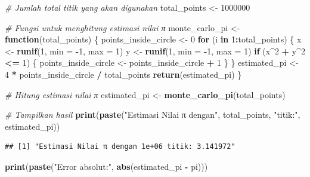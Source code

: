 \documentclass[
]{book}
\newenvironment{Shaded}{\begin{snugshade}}{\end{snugshade}}
\newcommand{\AttributeTok}[1]{\textcolor[rgb]{0.13,0.29,0.53}{#1}}
\newcommand{\CommentTok}[1]{\textcolor[rgb]{0.56,0.35,0.01}{\textit{#1}}}
\newcommand{\ControlFlowTok}[1]{\textcolor[rgb]{0.13,0.29,0.53}{\textbf{#1}}}
\newcommand{\DecValTok}[1]{\textcolor[rgb]{0.00,0.00,0.81}{#1}}
\newcommand{\FunctionTok}[1]{\textcolor[rgb]{0.13,0.29,0.53}{\textbf{#1}}}
\newcommand{\NormalTok}[1]{#1}
\newcommand{\OtherTok}[1]{\textcolor[rgb]{0.56,0.35,0.01}{#1}}
\newcommand{\SpecialCharTok}[1]{\textcolor[rgb]{0.81,0.36,0.00}{\textbf{#1}}}
\newcommand{\StringTok}[1]{\textcolor[rgb]{0.31,0.60,0.02}{#1}}
\theoremstyle{definition}
\theoremstyle{definition}
\theoremstyle{definition}
\theoremstyle{definition}
\theoremstyle{remark}
\begin{document}
\begin{Shaded}
\begin{Highlighting}[]
\CommentTok{\# Jumlah total titik yang akan digunakan}
\NormalTok{total\_points }\OtherTok{\textless{}{-}} \DecValTok{1000000}

\CommentTok{\# Fungsi untuk menghitung estimasi nilai π}
\NormalTok{monte\_carlo\_pi }\OtherTok{\textless{}{-}} \ControlFlowTok{function}\NormalTok{(total\_points) \{}
\NormalTok{  points\_inside\_circle }\OtherTok{\textless{}{-}} \DecValTok{0}
  \ControlFlowTok{for}\NormalTok{ (i }\ControlFlowTok{in} \DecValTok{1}\SpecialCharTok{:}\NormalTok{total\_points) \{}
\NormalTok{    x }\OtherTok{\textless{}{-}} \FunctionTok{runif}\NormalTok{(}\DecValTok{1}\NormalTok{, }\AttributeTok{min =} \SpecialCharTok{{-}}\DecValTok{1}\NormalTok{, }\AttributeTok{max =} \DecValTok{1}\NormalTok{)}
\NormalTok{    y }\OtherTok{\textless{}{-}} \FunctionTok{runif}\NormalTok{(}\DecValTok{1}\NormalTok{, }\AttributeTok{min =} \SpecialCharTok{{-}}\DecValTok{1}\NormalTok{, }\AttributeTok{max =} \DecValTok{1}\NormalTok{)}
    \ControlFlowTok{if}\NormalTok{ (x}\SpecialCharTok{\^{}}\DecValTok{2} \SpecialCharTok{+}\NormalTok{ y}\SpecialCharTok{\^{}}\DecValTok{2} \SpecialCharTok{\textless{}=} \DecValTok{1}\NormalTok{) \{}
\NormalTok{      points\_inside\_circle }\OtherTok{\textless{}{-}}\NormalTok{ points\_inside\_circle }\SpecialCharTok{+} \DecValTok{1}
\NormalTok{    \}}
\NormalTok{  \}}
\NormalTok{  estimated\_pi }\OtherTok{\textless{}{-}} \DecValTok{4} \SpecialCharTok{*}\NormalTok{ points\_inside\_circle }\SpecialCharTok{/}\NormalTok{ total\_points}
  \FunctionTok{return}\NormalTok{(estimated\_pi)}
\NormalTok{\}}

\CommentTok{\# Hitung estimasi nilai π}
\NormalTok{estimated\_pi }\OtherTok{\textless{}{-}} \FunctionTok{monte\_carlo\_pi}\NormalTok{(total\_points)}

\CommentTok{\# Tampilkan hasil}
\FunctionTok{print}\NormalTok{(}\FunctionTok{paste}\NormalTok{(}\StringTok{"Estimasi Nilai π dengan"}\NormalTok{, total\_points, }\StringTok{"titik:"}\NormalTok{, estimated\_pi))}
\end{Highlighting}
\end{Shaded}

\begin{verbatim}
## [1] "Estimasi Nilai π dengan 1e+06 titik: 3.141972"
\end{verbatim}

\begin{Shaded}
\begin{Highlighting}[]
\FunctionTok{print}\NormalTok{(}\FunctionTok{paste}\NormalTok{(}\StringTok{"Error absolut:"}\NormalTok{, }\FunctionTok{abs}\NormalTok{(estimated\_pi }\SpecialCharTok{{-}}\NormalTok{ pi)))}
\end{Highlighting}
\end{Shaded}
\end{document}
